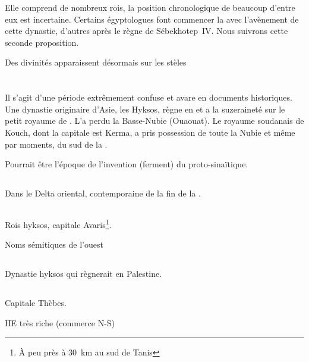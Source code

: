 Elle comprend de nombreux rois, la position chronologique de beaucoup 
d'entre eux est incertaine. Certains égyptologues font commencer la 
\DPI avec l'avènement de cette dynastie, d'autres après le règne de 
Sébekhotep~IV. Nous suivrons cette seconde proposition.

Des divinités apparaissent désormais sur les stèles

\section{\DPI}

Il s'agit d'une période extrêmement confuse et avare en documents 
historiques. Une dynastie originaire d'Asie, les Hyksos, règne en 
\BE et a la suzeraineté sur le petit royaume de \HE. L'\kmt a perdu la
Basse-Nubie (Ouaouat). Le royaume soudanais de Kouch, dont la capitale 
est Kerma, a pris possession de toute la Nubie et même par moments, 
du sud de la \HE.

Pourrait être l'époque de l'invention (ferment) du proto-sinaïtique.


\subsection{\texorpdfstring{}{XIVe dynastie}}

Dans le Delta oriental, contemporaine de la fin de la .

\subsection{\texorpdfstring{}{XVe dynastie}}

Rois hyksos, capitale Avaris\footnote{À peu près à \SI{30}{\km} au sud 
de Tanis}.

Noms sémitiques de l'ouest

\subsection{\texorpdfstring{}{XVIe dynastie}}

Dynastie hyksos qui règnerait en Palestine.

\subsection{\texorpdfstring{}{XVIIe dynastie}}

Capitale Thèbes.

HE très riche (commerce N-S)

